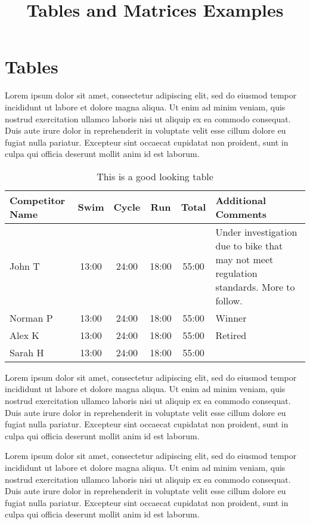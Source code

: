 \documentclass[]{article}
\title{Tables and Matrices Examples}
\author{}
\date{}
\begin{document}
\maketitle

\section{Tables}
Lorem ipsum dolor sit amet, consectetur adipiscing elit, sed do eiusmod tempor incididunt ut labore et dolore magna aliqua. Ut enim ad minim veniam, quis nostrud exercitation ullamco laboris nisi ut aliquip ex ea commodo consequat. Duis aute irure dolor in reprehenderit in voluptate velit esse cillum dolore eu fugiat nulla pariatur. Excepteur sint occaecat cupidatat non proident, sunt in culpa qui officia deserunt mollit anim id est laborum.

\begin{table}[h]
\centering
\caption{This is a good looking table}
\begin{tabular}{l | c | c | c | c | p{2in}}  %
Competitor Name & Swim & Cycle & Run & Total & Additional Comments\\
\hline \hline
John T & 13:00 & 24:00 & 18:00 & 55:00 & Under investigation due to bike that may not meet regulation standards. More to follow.\\
Norman P & 13:00 & 24:00 & 18:00 & 55:00 & Winner \\
Alex K & 13:00 & 24:00 & 18:00 & 55:00 & Retired \\
Sarah H & 13:00 & 24:00 & 18:00 & 55:00 

\end{tabular}
\end{table}

Lorem ipsum dolor sit amet, consectetur adipiscing elit, sed do eiusmod tempor incididunt ut labore et dolore magna aliqua. Ut enim ad minim veniam, quis nostrud exercitation ullamco laboris nisi ut aliquip ex ea commodo consequat. Duis aute irure dolor in reprehenderit in voluptate velit esse cillum dolore eu fugiat nulla pariatur. Excepteur sint occaecat cupidatat non proident, sunt in culpa qui officia deserunt mollit anim id est laborum.

Lorem ipsum dolor sit amet, consectetur adipiscing elit, sed do eiusmod tempor incididunt ut labore et dolore magna aliqua. Ut enim ad minim veniam, quis nostrud exercitation ullamco laboris nisi ut aliquip ex ea commodo consequat. Duis aute irure dolor in reprehenderit in voluptate velit esse cillum dolore eu fugiat nulla pariatur. Excepteur sint occaecat cupidatat non proident, sunt in culpa qui officia deserunt mollit anim id est laborum.
\end{document}
